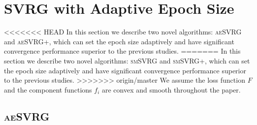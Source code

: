 \documentclass[conference]{IEEEtran}
\begin{document}
 \section{SVRG with Adaptive Epoch Size}
 \label{mywork}
<<<<<<< HEAD
 In this section we describe two novel algorithms: \textsc{aeSVRG} and \textsc{aeSVRG+}, which can set the epoch size adaptively and have significant convergence performance superior to the previous studies.
=======
 In this section we describe two novel algorithms: \textsc{smSVRG} and \textsc{smSVRG+}, which can set the epoch size adaptively and have significant convergence performance superior to the previous studies.
>>>>>>> origin/master
 We assume the loss function $F$ and the component functions $f_i$ are convex and smooth throughout the paper.
 
 \subsection{\textsc{aeSVRG}}
\end{document}
